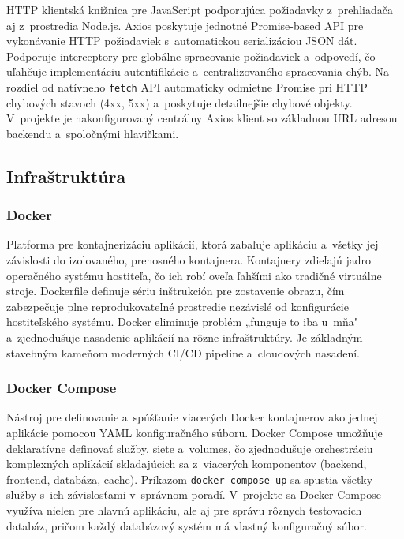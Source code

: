 \documentclass[a4paper, 12pt]{article}
\begin{document}
HTTP klientská knižnica pre JavaScript podporujúca požiadavky z~prehliadača aj z~prostredia Node.js. Axios poskytuje jednotné Promise-based API pre vykonávanie HTTP požiadaviek s~automatickou serializáciou JSON dát. Podporuje interceptory pre globálne spracovanie požiadaviek a~odpovedí, čo uľahčuje implementáciu autentifikácie a~centralizovaného spracovania chýb. Na rozdiel od natívneho \texttt{fetch} API automaticky odmietne Promise pri HTTP chybových stavoch (4xx, 5xx) a~poskytuje detailnejšie chybové objekty. V~projekte je nakonfigurovaný centrálny Axios klient so základnou URL adresou backendu a~spoločnými hlavičkami.


\subsection{Infraštruktúra}


\subsubsection*{Docker}

Platforma pre kontajnerizáciu aplikácií, ktorá zabaľuje aplikáciu a~všetky jej závislosti do izolovaného, prenosného kontajnera. Kontajnery zdieľajú jadro operačného systému hostiteľa, čo ich robí oveľa ľahšími ako tradičné virtuálne stroje. Dockerfile definuje sériu inštrukción pre zostavenie obrazu, čím zabezpečuje plne reprodukovateľné prostredie nezávislé od konfigurácie hostiteľského systému. Docker eliminuje problém „funguje to iba u~mňa" a~zjednodušuje nasadenie aplikácií na rôzne infraštruktúry. Je základným stavebným kameňom moderných CI/CD pipeline a~cloudových nasadení.

\subsubsection*{Docker Compose}

Nástroj pre definovanie a~spúšťanie viacerých Docker kontajnerov ako jednej aplikácie pomocou YAML konfiguračného súboru. Docker Compose umožňuje deklaratívne definovať služby, siete a~volumes, čo zjednodušuje orchestráciu komplexných aplikácií skladajúcich sa z~viacerých komponentov (backend, frontend, databáza, cache). Príkazom \texttt{docker compose up} sa spustia všetky služby s~ich závislosťami v~správnom poradí. V~projekte sa Docker Compose využíva nielen pre hlavnú aplikáciu, ale aj pre správu rôznych testovacích databáz, pričom každý databázový systém má vlastný konfiguračný súbor.
\end{document}
